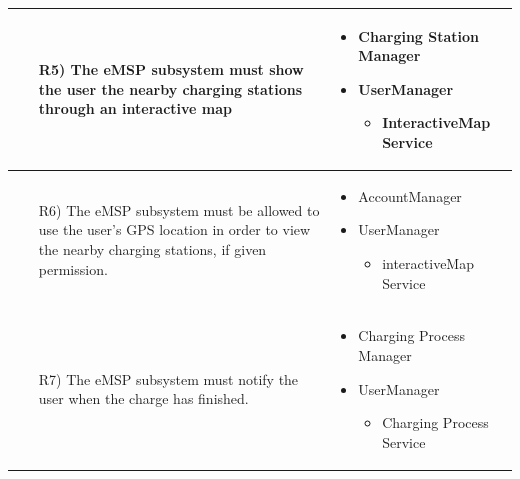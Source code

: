 \documentclass[table, 12pt]{article}
\begin{document}
\begin{longtable}{|p{}|p{}|}
    \begin{itemize}
        \item[R5)] The eMSP subsystem must show the user the nearby charging stations through an interactive map
    \end{itemize}
    & 
    \begin{itemize}
        \item Charging Station Manager
        \item UserManager
        \begin{itemize}
            \setlength{\itemindent}{-5px}
            \item InteractiveMap Service
        \end{itemize}
    \end{itemize}
    \\\hline

    \begin{itemize}
        \item[R6)] The eMSP subsystem must be allowed to use the user's GPS location in order to view the nearby charging stations, if given permission.
    \end{itemize}
    & 
    \begin{itemize}
        \item AccountManager %
        \item UserManager
        \begin{itemize}
            \setlength{\itemindent}{-5px}
            \item interactiveMap Service
        \end{itemize}
    \end{itemize}
    \\\hline

    \begin{itemize}
        \item[R7)] The eMSP subsystem must notify the user when the charge has finished.
    \end{itemize}
    & 
    \begin{itemize}
        \item Charging Process Manager
        \item UserManager
        \begin{itemize}
            \setlength{\itemindent}{-5px}
            \item Charging Process Service
        \end{itemize}
    \end{itemize}
    \\\hline


\end{longtable}
\end{document}
